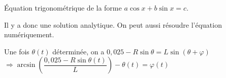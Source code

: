 Équation trigonométrique de la forme $a\cos x  + b\sin x =c$.

Il y a donc une solution analytique. On peut aussi résoudre l'équation numériquement.


Une fois $\theta(t)$ déterminée, on a $0,025 - R \sin\theta  = L\sin\left(\theta+\varphi\right)$ 
$\Rightarrow \arcsin\left(\dfrac{0,025 - R \sin\theta(t)}{L}\right)  - \theta(t) = \varphi(t)$

\else
\fi


\ifprof
\else
\fi


\ifprof
\else
{}
\fi